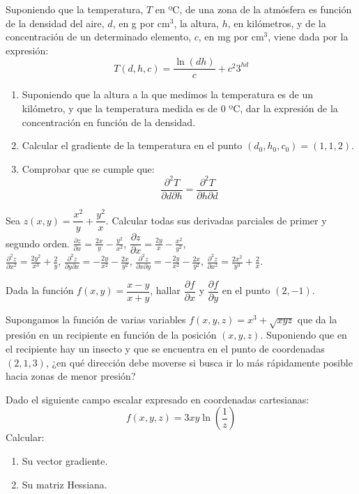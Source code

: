 {Suponiendo que la temperatura, $T$ en ºC, de una zona de la atmósfera es función de la densidad del aire, $d$, en g por cm$^3$, la altura, $h$, en kilómetros, y de la concentración de un determinado elemento, $c$, en mg por cm$^3$, viene dada por la expresión:
\[
T(d,h,c) = \frac{{\ln (dh)}}{c} + c^2 3^{hd}
\]
\begin{enumerate}
\item Suponiendo que la altura a la que medimos la temperatura es de un kilómetro, y que la temperatura medida es de 0 ºC, dar la expresión de la concentración en función de la densidad.
\item Calcular el gradiente de la temperatura en el punto $(d_0,h_0,c_0)=(1,1,2)$.
\item Comprobar que se cumple que:
\[
\frac{{\partial ^2 T}}{{\partial d\partial h}} = \frac{{\partial ^2
T}}{{\partial h\partial d}}
\]
\end{enumerate}
}


{Sea $z(x,y)=\dfrac{x^{2}}{y}+\dfrac{y^{2}}{x}.$ Calcular todas sus derivadas parciales de primer y segundo orden.
}
{$\frac{\partial z}{\partial x} = \frac{2x}{y}-\frac{y^2}{x^2}$, $\dfrac{\partial z}{\partial x} = \frac{2y}{x}-\frac{x^2}{y^2}$,\\
$\frac{\partial^2 z}{\partial x^2} = \frac{2y^2}{x^3}+\frac{2}{y}$, $\frac{\partial^2 z}{\partial y\partial x} = -\frac{2y}{x^2}-\frac{2x}{y^2}$, $\frac{\partial^2 z}{\partial x\partial y} = -\frac{2y}{x^2}-\frac{2x}{y^2}$, $\frac{\partial^2 z}{\partial x^2} = \frac{2x^2}{y^3}+\frac{2}{x}$.
}
{
}


{Dada la función $f(x,y)=\dfrac{x-y}{x+y}$, hallar $\dfrac{\partial f}{\partial x}$ y $\dfrac{\partial f}{\partial y}$ en el punto $(2,-1)$.
}


{Supongamos la función de varias variables $f(x,y,z)=x^{3}+\sqrt{xyz}$ que da la presión en un recipiente en función de la posición $(x,y,z)$. Suponiendo que en el recipiente hay un insecto y que se encuentra en el punto de coordenadas $(2,1,3)$, ¿en qué dirección debe moverse si busca ir lo más rápidamente posible hacia zonas de menor presión?
}


{Dado el siguiente campo escalar expresado en coordenadas cartesianas:
\[
f(x,y,z)=3xy\ln \left( \dfrac{1}{z}\right)
\]
Calcular:
\begin{enumerate}
\item  Su vector gradiente.
\item  Su matriz Hessiana.
\end{enumerate}
}


